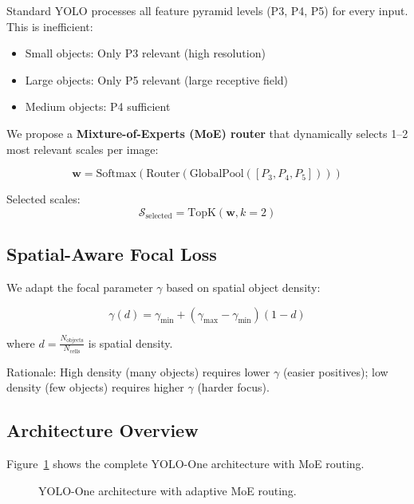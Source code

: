 \documentclass[conference]{IEEEtran}
\begin{document}
Standard YOLO processes all feature pyramid levels (P3, P4, P5) for every input. This is inefficient:

\begin{itemize}
\item Small objects: Only P3 relevant (high resolution)
\item Large objects: Only P5 relevant (large receptive field)
\item Medium objects: P4 sufficient
\end{itemize}

We propose a \textbf{Mixture-of-Experts (MoE) router} that dynamically selects 1--2 most relevant scales per image:

\begin{equation}
\mathbf{w} = \text{Softmax}(\text{Router}(\text{GlobalPool}([P_3, P_4, P_5])))
\end{equation}

Selected scales:
\begin{equation}
\mathcal{S}_{\text{selected}} = \text{TopK}(\mathbf{w}, k=2)
\end{equation}

\subsection{Spatial-Aware Focal Loss}

We adapt the focal parameter $\gamma$ based on spatial object density:

\begin{equation}
\gamma(d) = \gamma_{\min} + (\gamma_{\max} - \gamma_{\min})(1 - d)
\end{equation}

where $d = \frac{N_{\text{objects}}}{N_{\text{cells}}}$ is spatial density.

Rationale: High density (many objects) requires lower $\gamma$ (easier positives); low density (few objects) requires higher $\gamma$ (harder focus).

\subsection{Architecture Overview}

Figure~\ref{fig:architecture} shows the complete YOLO-One architecture with MoE routing.

\begin{figure}[t]
\centering
\caption{YOLO-One architecture with adaptive MoE routing.}
\label{fig:architecture}
\end{figure}
\end{document}
